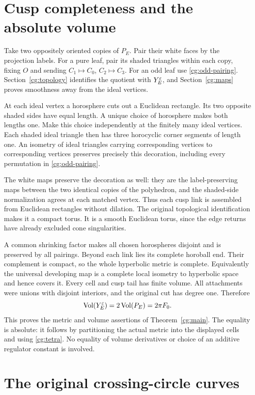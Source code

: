 \section{Cusp completeness and the absolute volume}
\label{cg:complete}

Take two oppositely oriented copies of $P_E$. Pair their white
faces by the projection labels. For a pure leaf, pair its shaded
triangles within each copy, fixing $O$ and sending
$C_1\mapsto C_0$, $C_2\mapsto C_3$. For an odd leaf use
\eqref{cg:odd-pairing}. Section~\ref{cg:topology} identifies the
quotient with $Y^\varepsilon_E$, and Section~\ref{cg:maps} proves
smoothness away from the ideal vertices.

At each ideal vertex a horosphere cuts out a Euclidean rectangle.
Its two opposite shaded sides have equal length. A unique choice
of horosphere makes both lengths one. Make this choice independently
at the finitely many ideal vertices. Each shaded ideal triangle
then has three horocyclic corner segments of length one. An
isometry of ideal triangles carrying corresponding vertices to
corresponding vertices preserves precisely this decoration,
including every permutation in \eqref{cg:odd-pairing}.

The white maps preserve the decoration as well: they are the
label-preserving maps between the two identical copies of the
polyhedron, and the shaded-side normalization agrees at each
matched vertex. Thus each cusp link is assembled from Euclidean
rectangles without dilation. The original topological identification
makes it a compact torus. It is a smooth Euclidean torus, since
the edge returns have already excluded cone singularities.

A common shrinking factor makes all chosen horospheres disjoint
and is preserved by all pairings. Beyond each link lies its
complete horoball end. Their complement is compact, so the whole
hyperbolic metric is complete. Equivalently the universal developing
map is a complete local isometry to hyperbolic space and hence
covers it. Every cell and cusp tail has finite volume. All
attachments were unions with disjoint interiors, and the original
cut has degree one. Therefore
\[
 \operatorname{Vol}(Y^\varepsilon_E)=2\operatorname{Vol}(P_E)=2\pi F_0.
 \]
This proves the metric and volume assertions of
Theorem~\ref{cg:main}. The equality is absolute: it follows by
partitioning the actual metric into the displayed cells and using
\eqref{cg:tetra}. No equality of volume derivatives or choice of
an additive regulator constant is involved.

\section{The original crossing-circle curves}
\label{cg:peripheral}

